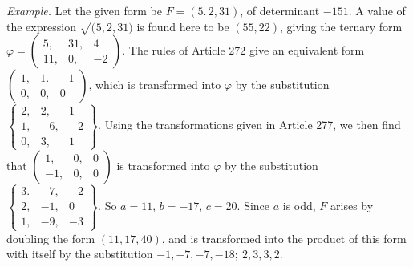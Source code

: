 \textit{Example.} Let the given form be $F=(5.\,2,31)$, of determinant $-151$.
A value of the expression $\surd(5,2,31)$ is found here to be $(55,22)$, giving
the ternary form $\varphi=\left(\begin{smallmatrix}5,&31,&4\\11,&0,&-2\end{smallmatrix}\right)$. The rules of Article 272 give an equivalent
form $\left(\begin{smallmatrix}1,&1.&-1\\0,&0,&0\end{smallmatrix}\right)$, which is transformed into $\varphi$ by the substitution
$\left\{\begin{smallmatrix}2,&2,&1\\1,&-6,&-2\\0,&3,&1\end{smallmatrix}\right\}$. Using the transformations given in Article 277, we then find
that $\left(\begin{smallmatrix}1,&0,&0\\-1,&0,&0\end{smallmatrix}\right)$ is transformed into $\varphi$ by the substitution $\left\{\begin{smallmatrix}3.&-7,&-2\\2,&-1,&0\\1,&-9,&-3\end{smallmatrix}\right\}$.
So $a=11$, $b=-17$, $c=20$. Since $a$ is odd, $F$ arises
by doubling the form $(11,17,40)$, and is transformed into the product of
this form with itself by the substitution $-1,-7,-7,-18;\ 2,3,3,2$.


